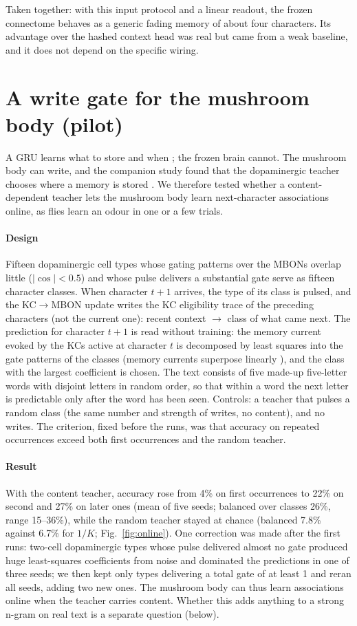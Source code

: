 \documentclass[conference]{IEEEtran}
\begin{document}
Taken together: with this input protocol and a linear readout, the frozen
connectome behaves as a generic fading memory of about four characters. Its
advantage over the hashed context head was real but came from a weak
baseline, and it does not depend on the specific wiring.

\section{A write gate for the mushroom body (pilot)}
A GRU learns what to store and when \cite{cho2014}; the frozen brain cannot.
The mushroom body can write, and the companion study found that the
dopaminergic teacher chooses where a memory is stored \cite{mechpaper}. We
therefore tested whether a content-dependent teacher lets the mushroom body
learn next-character associations online, as flies learn an odour in one or
a few trials.

\paragraph*{Design} Fifteen dopaminergic cell types whose gating patterns
over the MBONs overlap little ($|\cos|<0.5$) and whose pulse delivers a
substantial gate serve as fifteen character classes. When character $t+1$
arrives, the type of its class is pulsed, and the KC$\rightarrow$MBON update
writes the KC eligibility trace of the preceding characters (not the current
one): recent context $\rightarrow$ class of what came next. The prediction
for character $t+1$ is read without training: the memory current evoked by
the KCs active at character $t$ is decomposed by least squares into the gate
patterns of the classes (memory currents superpose linearly
\cite{mechpaper}), and the class with the largest coefficient is chosen. The
text consists of five made-up five-letter words with disjoint letters in
random order, so that within a word the next letter is predictable only after
the word has been seen. Controls: a teacher that pulses a random class (the
same number and strength of writes, no content), and no writes. The criterion,
fixed before the runs, was that accuracy on repeated occurrences exceed both
first occurrences and the random teacher.

\paragraph*{Result} With the content teacher, accuracy rose from 4\% on first
occurrences to 22\% on second and 27\% on later ones (mean of five seeds;
balanced over classes 26\%, range 15--36\%), while the random teacher stayed
at chance (balanced 7.8\% against 6.7\% for $1/K$; Fig.~\ref{fig:online}).
One correction was made after the first runs: two-cell dopaminergic types
whose pulse delivered almost no gate produced huge least-squares coefficients
from noise and dominated the predictions in one of three seeds; we then kept
only types delivering a total gate of at least 1 and reran all seeds, adding
two new ones. The mushroom body can thus learn associations online when the
teacher carries content. Whether this adds anything to a strong n-gram on real
text is a separate question (below).
\end{document}
